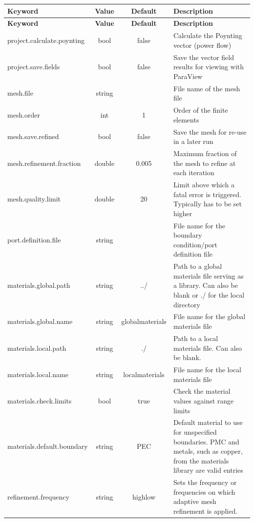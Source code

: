 \documentclass[titlepage]{article}
\renewcommand\_{\textunderscore\linebreak[1]}
\begin{document}
\tabcolsep=0.05cm
\small
\begin{longtable}[c]{|lccp{8cm}|}
    \hline
    \textbf{Keyword} & \textbf{Value} & \textbf{Default} & \textbf{Description} \\
    \hline
    \endfirsthead
    \hline
    \textbf{Keyword} & \textbf{Value} & \textbf{Default} & \textbf{Description} \\
    \hline
    \endhead
    project.calculate.poynting   & bool   & false & Calculate the Poynting vector (power flow) \\
    project.save.fields          & bool   & false & Save the vector field results for viewing with ParaView \\
    mesh.file                    & string &       & File name of the mesh file \\
    mesh.order                   & int    & 1     & Order of the finite elements \\
    mesh.save.refined            & bool   & false & Save the mesh for re-use in a later run \\
    mesh.refinement.fraction     & double & 0.005 & Maximum fraction of the mesh to refine at each iteration \\
    mesh.quality.limit           & double & 20    & Limit above which a fatal error is triggered. Typically has to be set higher \\
    port.definition.file         & string &       & File name for the boundary condition/port definition file \\
    materials.global.path        & string & ../   & Path to a global materials file serving as a library.  Can also be blank or ./ for the local directory \\
    materials.global.name        & string & global\_materials & File name for the global materials file \\
    materials.local.path         & string & ./    & Path to a local materials file. Can also be blank. \\
    materials.local.name         & string & local\_materials & File name for the local materials file \\
    materials.check.limits       & bool   & true  & Check the material values against range limits \\
    materials.default.boundary   & string & PEC   & Default material to use for unspecified boundaries.  PMC and metals, such as copper, from the materials library are valid entries \\
    refinement.frequency         & string & highlow & Sets the frequency or frequencies on which adaptive mesh refinement is applied.
                                                   

\end{longtable}
\end{document}
